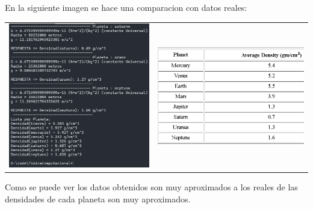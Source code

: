 \documentclass[a4paper,12pt]{article}
\begin{document}
    En la siguiente imagen se hace una comparacion con datos reales:
    \begin{table}[hbp]
        \centering
        \begin{tabular}{cc}
            \begin{minipage}{.3\textwidth}
                \includegraphics[width=\linewidth]{e2_2}
            \end{minipage}&
            \begin{minipage}{.3\textwidth}
                \includegraphics[width=\linewidth]{e2real}
            \end{minipage}        
        \end{tabular}
    \end{table}
    Como se puede ver los datos obtenidos son muy aproximados a los reales de las  
    densidades de cada planeta son muy aproximados.
\end{document}

